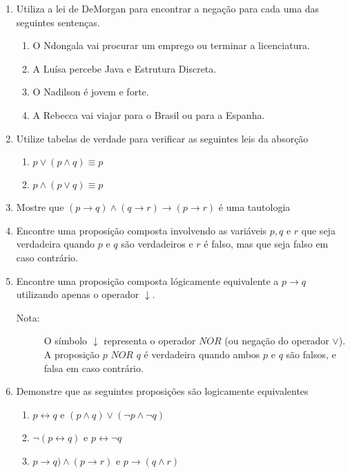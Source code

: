 \begin{enumerate}
	 \item Utiliza a lei de DeMorgan para encontrar a negação para cada uma das seguintes sentenças.
	 \begin{enumerate}
	   	\item O Ndongala vai procurar um emprego ou terminar a licenciatura.
	   	\item A Luísa percebe Java e Estrutura Discreta.
	   	\item O Nadilson é jovem e forte.
	   	\item A Rebecca vai viajar para o Brasil ou para a Espanha.
	 \end{enumerate}
	 \item Utilize tabelas de verdade para verificar as seguintes leis da absorção
	 \begin{enumerate}
	 	\item  $p \lor (p \land q) \equiv p$ \item $p \land (p \lor q) \equiv p$
	\end{enumerate}
	\item Mostre que $(p \to q) \land (q \to r) \to (p \to r)$ é uma tautologia
	\item Encontre uma proposição composta involvendo as variáveis $p, q$ e $r$ que seja verdadeira quando $p$ e $q$ são 
	verdadeiros e $r$ é falso, mas que seja falso em caso contrário.
	\item Encontre uma proposição composta lógicamente equivalente a $p \to q$
	utilizando apenas o operador $\downarrow$.
	\begin{description}
	\item[Nota:] O símbolo $\downarrow$ representa o operador $NOR$ (ou negação do
	operador $\lor$).
	A proposição $p$ $NOR$ $q$ é verdadeira quando ambos $p$ e $q$ são falsos, e
	falsa em caso contrário.
	\end{description}
	\item Demonstre que as seguintes proposições são logicamente equivalentes
	\begin{enumerate}
		\item $p \leftrightarrow q$ e $(p \land q) \lor (\lnot p \land \lnot q)$
		\item $\lnot (p \leftrightarrow q)$ e $p \leftrightarrow \lnot q$
		\item $p \to q) \land (p \to r)$ e $p \to (q \land r)$
	\end{enumerate}


\end{enumerate}
